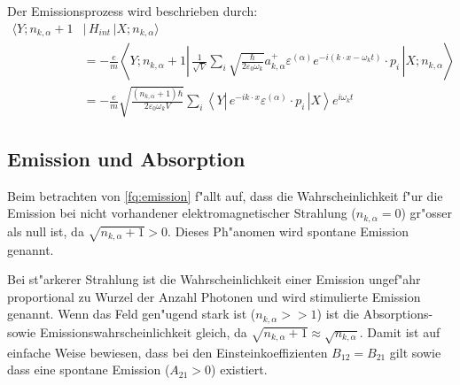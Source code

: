 Der Emissionsprozess wird beschrieben durch:
\begin{equation} \label{fq:emission}
\begin{split}
\langle Y; n_{k,\alpha} + 1 &|\, H_{int} \,| X; n_{k,\alpha} \rangle \\
&= -\frac{e}{m} \left\langle Y; n_{k,\alpha} + 1 \left| 
\, \frac{1}{\sqrt{V}} \sum_i \sqrt{\frac{\hbar}{2 \varepsilon_0 \omega_k}}a^+_{k,\alpha} \varepsilon^{(\alpha)} e^{-i(k \cdot x-\omega_k t)} \cdot p_i \,
\right| X; n_{k,\alpha} \right\rangle\\
&= -\frac{e}{m} \sqrt{\frac{ (n_{k,\alpha}+1) \hbar}{2 \varepsilon_0 \omega_k V}} \sum_i \left\langle Y \left| 
\, e^{-ik \cdot x} \varepsilon^{(\alpha)} \cdot p_i \,
\right| X \right\rangle e^{i\omega_k t}
\end{split}
\end{equation}

\subsection{Emission und Absorption}
Beim betrachten von \ref{fq:emission} f"allt auf, dass die Wahrscheinlichkeit f"ur die Emission bei nicht vorhandener elektromagnetischer Strahlung ($n_{k,\alpha} = 0$) gr"osser als null ist, da $\sqrt{n_{k,\alpha}+1} > 0$. Dieses Ph"anomen wird spontane Emission genannt.

Bei st"arkerer Strahlung ist die Wahrscheinlichkeit einer Emission ungef"ahr proportional zu Wurzel der Anzahl Photonen und wird stimulierte Emission genannt.
Wenn das Feld gen"ugend stark ist ($n_{k,\alpha} >> 1$) ist die Absorptions- sowie Emissionswahrscheinlichkeit gleich, da $\sqrt{n_{k,\alpha}+1} \approx \sqrt{n_{k,\alpha}}$. Damit ist auf einfache Weise bewiesen, dass bei den Einsteinkoeffizienten \cite{fq:einstein_koeff} $B_{12} = B_{21}$ gilt sowie dass eine spontane Emission ($A_{21} > 0$) existiert.